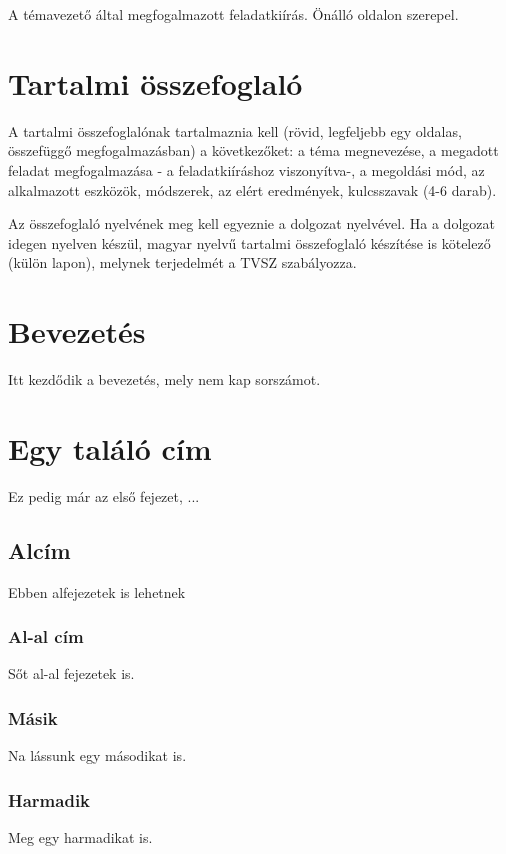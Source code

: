 \documentclass[12pt]{report}
\theoremstyle{definition}
\begin{document}
A témavezető által megfogalmazott feladatkiírás. Önálló oldalon szerepel.

\chapter*{Tartalmi összefoglaló}

A tartalmi összefoglalónak tartalmaznia kell (rövid, legfeljebb egy oldalas, összefüggő megfogalmazásban)
a következőket: a téma megnevezése, a megadott feladat megfogalmazása - a feladatkiíráshoz viszonyítva-,
a megoldási mód, az alkalmazott eszközök, módszerek, az elért eredmények, kulcsszavak (4-6 darab).

Az összefoglaló nyelvének meg kell egyeznie a dolgozat nyelvével. Ha a dolgozat idegen nyelven készül,
magyar nyelvű tartalmi összefoglaló készítése is kötelező (külön lapon), melynek terjedelmét a TVSZ szabályozza.


\chapter*{Bevezetés}

Itt kezdődik a bevezetés, mely nem kap sorszámot.



\chapter{Egy találó cím}

Ez pedig már az első fejezet, ...

\section{Alcím}
Ebben alfejezetek is lehetnek

\subsection{Al-al cím}
Sőt al-al fejezetek is.

\subsection{Másik}
Na lássunk egy másodikat is.

\subsection{Harmadik}
Meg egy harmadikat is.
\end{document}
